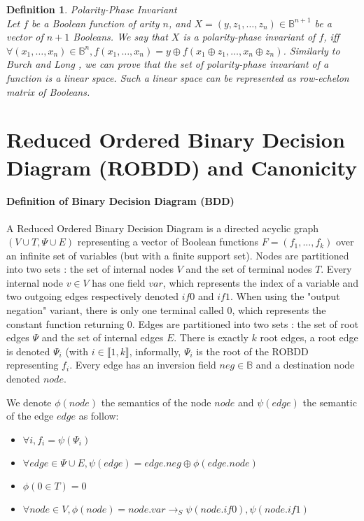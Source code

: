 \documentclass[a4paper,10pt]{article}
\newcommand{\shannon}[3]{#1 \longrightarrow_S #2, #3}
\newcommand{\B}{\mathbb{B}}
\newtheorem{newdef}{Definition}
\newcommand{\definition}[2]{\begin{newdef}{#1\\}#2\end{newdef}}
\begin{document}
\definition{Polarity-Phase Invariant}
{
Let $f$ be a Boolean function of arity $n$, and $X=(y, z_1, \dots, z_n)\in\B^{n+1}$ be a vector of $n+1$ Booleans.
We say that $X$ is a polarity-phase invariant of $f$, iff $\forall (x_1, \dots, x_n)\in\B^n, f(x_1, \dots, x_n) = y\oplus{}f(x_1\oplus{}z_1, \dots, x_n\oplus{}z_n)$.
Similarly to Burch and Long \cite{BurchLong1992}, we can prove that the set of polarity-phase invariant of a function is a linear space.
Such a linear space can be represented as row-echelon matrix of Booleans.
}

\section{Reduced Ordered Binary Decision Diagram (ROBDD) and Canonicity}

\paragraph{Definition of Binary Decision Diagram (BDD)\\}

A Reduced Ordered Binary Decision Diagram is a directed acyclic graph $(V\cup T, \Psi \cup E)$ representing a vector of Boolean functions $F=(f_1, ..., f_k)$ over an infinite set of variables (but with a finite support set).
Nodes are partitioned into two sets : the set of internal nodes $V$ and the set of terminal nodes $T$.
Every internal node $v\in V$ has one field $\mathit{var}$, which represents the index of a variable and two outgoing edges respectively denoted $\mathit{if0}$ and $\mathit{if1}$.
When using the "output negation" variant, there is only one terminal called 0, which represents the constant function returning 0.
Edges are partitioned into two sets : the set of root edges $\Psi$ and the set of internal edges $E$.
There is exactly $k$ root edges, a root edge is denoted $\Psi_i$ (with $i\in\llbracket 1, k \rrbracket$, informally, $\Psi_i$ is the root of the ROBDD representing $f_i$.
Every edge has an inversion field $neg \in \B$ and a destination node denoted $\mathit{node}$.


We denote $\phi(node)$ the semantics of the node $node$ and $\psi(edge)$ the semantic of the edge $edge$ as follow:\begin{itemize}
\item $\forall i, f_i = \psi(\Psi_i)$
\item $\forall edge \in \Psi \cup E, \psi(edge) = edge.neg \oplus \phi(edge.\mathit{node})$
\item $\phi(0 \in T) = 0$
\item $\forall node \in V, \phi(node) = \shannon{node.\mathit{var}}{\psi(node.\mathit{if0})}{\psi(node.\mathit{if1})}$
\end{itemize}
\end{document}
